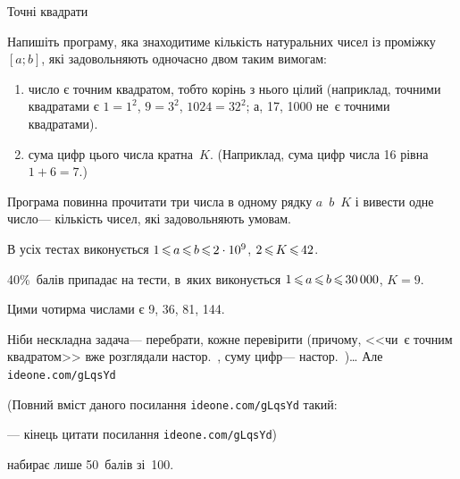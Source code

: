 \documentclass[14pt,a4paper]{extarticle}
\def\dib#1{\,#1\discretionary{}{\mbox{$#1$}}{}\,}
\renewcommand{\baselinestretch}{1.3125}
\begin{document}
\begin{problemAllDefault}{Точні квадрати}

Напишіть програму, яка знаходитиме кількість натуральних чисел із проміжку $[a; b]$, які задовольняють одночасно двом таким вимогам:
\begin{enumerate}
\item
число є точним квадратом, тобто корінь з нього цілий (наприклад, точними квадратами є ${1{=}1^2}$, ${9{=}3^2}$, ${1024{=}32^2}$; а, 17, 1000 не~є точними квадратами).
\item
сума цифр цього числа кратна~$K$. (Наприклад, сума цифр числа 16 рівна ${1{+}6{=}7}$.)
\end{enumerate}
Програма повинна прочитати три числа в одному рядку $a$~$b$~$K$ і вивести одне число\nolinebreak[3] --- кількість чисел, які задовольняють умовам.

\Scoring	В усіх тестах виконується $1\dib{{\<}}a\dib{{\<}}b\dib{{\<}}2\cdot10^9$, $2\dib{{\<}}K\dib{{\<}}42$. 

40\%~балів припадає на тести, в~яких виконується $1\dib{{\<}}a\dib{{\<}}b\dib{{\<}}30\,000$, ${K{=}9}$.


\Example
\begin{exampleSimple}{5em}{3em}%
%
\end{exampleSimple}

\Note	Цими чотирма числами є 9, 36, 81, 144. 

\end{problemAllDefault}
	

\Tutorial	Ніби нескладна задача\nolinebreak[3] --- перебрати, кожне перевірити (причому, <<чи~є точним квадратом>> вже розглядали на\nolinebreak[3] стор.~\pageref{text:how-to-test-if-sqrt-N-integer}, суму цифр\nolinebreak[3] --- на\nolinebreak[3] стор.~\pageref{text:sum-of-digits})\dots{}
Але 
\verb"ideone.com/gLqsYd"


{\color{green}\begin{small}

\renewcommand{\baselinestretch}{0.875}

(Повний вміст даного посилання \verb"ideone.com/gLqsYd" такий:

--- кінець цитати посилання \verb"ideone.com/gLqsYd")

\end{small}}


 набирає лише 50~балів зі~100.
\end{document}
